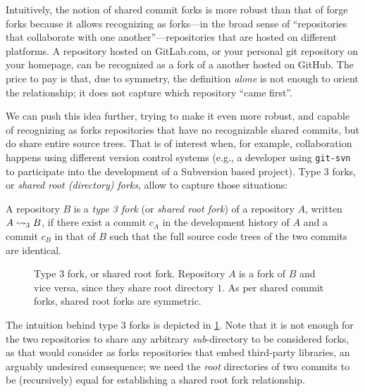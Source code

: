 Intuitively, the notion of shared commit forks is more robust than that of
forge forks because it allows recognizing as forks---in the broad sense of
``repositories that collaborate with one another''---repositories that are
hosted on different platforms. A repository hosted on GitLab.com, or your
personal git repository on your homepage, can be recognized as a fork of a
another hosted on GitHub. The price to pay is that, due to symmetry, the
definition \emph{alone} is not enough to orient the relationship; it does not
capture which repository ``came first''.

We can push this idea further, trying to make it even more robust, and capable
of recognizing as forks repositories that have no recognizable shared commits,
but do share entire source trees. That is of interest when, for example,
collaboration happens using different version control systems (e.g., a
developer using \texttt{git-svn} to participate into the development of a
Subversion based project). Type 3 forks, or \emph{shared root (directory)
forks}, allow to capture those situations:

\begin{definition}%
  \label{def:rootdir-fork}%
  \label{def:type3-fork}
  A repository $B$ is a \emph{type 3 fork} (or \emph{shared root fork}) of a
  repository $A$, written $A\rightsquigarrow_3 B$, if there exist a commit $c_A$ in the
  development history of $A$ and a commit $c_B$ in that of $B$ such that the
  full source code trees of the two commits are identical.
\end{definition}

\begin{figure}[t]
  \centering
  
  \caption{Type 3 fork, or shared root fork. Repository $A$ is a fork of $B$
    and vice versa, since they share root directory $1$.  As per shared commit
    forks, shared root forks are symmetric.}%
  \label{fig:rootdir-fork}%
  \label{fig:type3-fork}
\end{figure}

The intuition behind type 3 forks is depicted in \cref{fig:type3-fork}. Note
that it is not enough for the two repositories to share any arbitrary
\emph{sub}-directory to be considered forks, as that would consider as forks
repositories that embed third-party libraries, an arguably undesired
consequence; we need the \emph{root} directories of two commits to be
(recursively) equal for establishing a shared root fork relationship.


